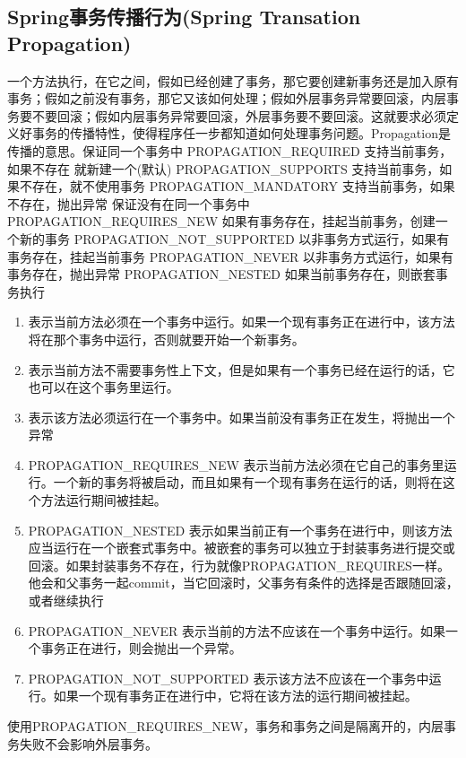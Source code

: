 \documentclass[../../../interview-questions.tex]{subfiles}
\begin{document}
\subsection{Spring事务传播行为(Spring Transation Propagation)}

一个方法执行，在它之间，假如已经创建了事务，那它要创建新事务还是加入原有事务；假如之前没有事务，那它又该如何处理；假如外层事务异常要回滚，内层事务要不要回滚；假如内层事务异常要回滚，外层事务要不要回滚。这就要求必须定义好事务的传播特性，使得程序任一步都知道如何处理事务问题。Propagation是传播的意思。保证同一个事务中
PROPAGATION\_REQUIRED 支持当前事务，如果不存在 就新建一个(默认)
PROPAGATION\_SUPPORTS 支持当前事务，如果不存在，就不使用事务
PROPAGATION\_MANDATORY 支持当前事务，如果不存在，抛出异常
保证没有在同一个事务中
PROPAGATION\_REQUIRES\_NEW 如果有事务存在，挂起当前事务，创建一个新的事务
PROPAGATION\_NOT\_SUPPORTED 以非事务方式运行，如果有事务存在，挂起当前事务
PROPAGATION\_NEVER 以非事务方式运行，如果有事务存在，抛出异常
PROPAGATION\_NESTED 如果当前事务存在，则嵌套事务执行

\begin{enumerate}
\item {\color{blue}{PROPAGATION\_REQUIRES}}	表示当前方法必须在一个事务中运行。如果一个现有事务正在进行中，该方法将在那个事务中运行，否则就要开始一个新事务。
\item{\color{blue}{PROPAGATION\_SUPPORTS}}	表示当前方法不需要事务性上下文，但是如果有一个事务已经在运行的话，它也可以在这个事务里运行。
\item{\color{blue}{PROPAGATION\_MANDATORY}}	表示该方法必须运行在一个事务中。如果当前没有事务正在发生，将抛出一个异常

\item{PROPAGATION\_REQUIRES\_NEW	表示当前方法必须在它自己的事务里运行。一个新的事务将被启动，而且如果有一个现有事务在运行的话，则将在这个方法运行期间被挂起。}
\item{PROPAGATION\_NESTED	表示如果当前正有一个事务在进行中，则该方法应当运行在一个嵌套式事务中。被嵌套的事务可以独立于封装事务进行提交或回滚。如果封装事务不存在，行为就像PROPAGATION\_REQUIRES一样。他会和父事务一起commit，当它回滚时，父事务有条件的选择是否跟随回滚，或者继续执行}
\item{PROPAGATION\_NEVER	表示当前的方法不应该在一个事务中运行。如果一个事务正在进行，则会抛出一个异常。}
\item{PROPAGATION\_NOT\_SUPPORTED	表示该方法不应该在一个事务中运行。如果一个现有事务正在进行中，它将在该方法的运行期间被挂起。}
\end{enumerate}

使用PROPAGATION\_REQUIRES\_NEW，事务和事务之间是隔离开的，内层事务失败不会影响外层事务。
\end{document}
